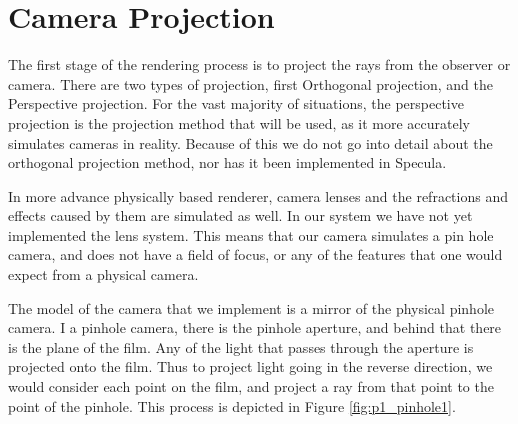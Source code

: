 \documentclass[../pbr.tex]{subfile}
\begin{document}
\section{Camera Projection}%
\label{sec:camera_projection}

The first stage of the rendering process is to project the rays from the
observer or camera. There are two types of projection, first Orthogonal
projection, and the Perspective projection. For the vast majority of
situations, the perspective projection is the projection method that will be
used, as it more accurately simulates cameras in reality. Because of this we do
not go into detail about the orthogonal projection method, nor has it been
implemented in Specula.

In more advance physically based renderer, camera lenses and the refractions
and effects caused by them are simulated as well. In our system we have not yet
implemented the lens system. This means that our camera simulates a pin hole
camera, and does not have a field of focus, or any of the features that one
would expect from a physical camera.

The model of the camera that we implement is a mirror of the physical pinhole
camera. I a pinhole camera, there is the pinhole aperture, and behind that
there is the plane of the film. Any of the light that passes through the
aperture is projected onto the film. Thus to project light going in the reverse
direction, we would consider each point on the film, and project a ray from
that point to the point of the pinhole. This process is depicted in Figure
\ref{fig:p1_pinhole1}.
\end{document}
